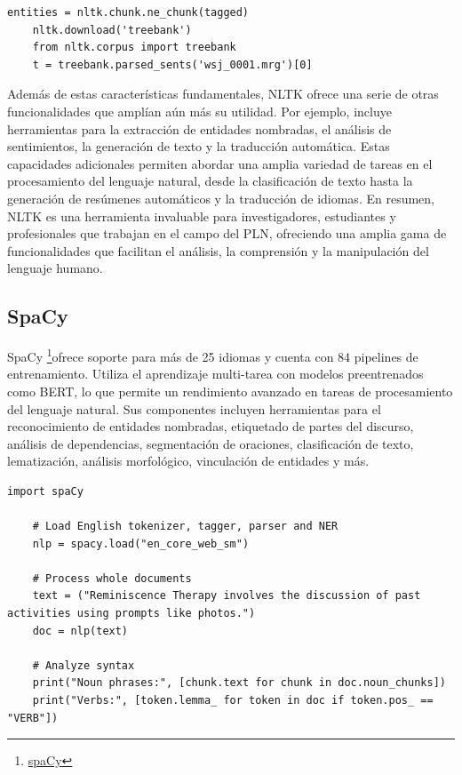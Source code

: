 \begin{lstlisting}[style=SpyderStyle, caption={Análisis sintáctico y lematización con nltk}, captionpos=b, label={lst:python},breaklines = true]
	entities = nltk.chunk.ne_chunk(tagged)
	nltk.download('treebank')
	from nltk.corpus import treebank
	t = treebank.parsed_sents('wsj_0001.mrg')[0]
\end{lstlisting}


Además de estas características fundamentales, NLTK ofrece una serie de otras funcionalidades que amplían aún más su utilidad. Por ejemplo, incluye herramientas para la extracción de entidades nombradas, el análisis de sentimientos, la generación de texto y la traducción automática. Estas capacidades adicionales permiten abordar una amplia variedad de tareas en el procesamiento del lenguaje natural, desde la clasificación de texto hasta la generación de resúmenes automáticos y la traducción de idiomas. En resumen, NLTK es una herramienta invaluable para investigadores, estudiantes y profesionales que trabajan en el campo del PLN, ofreciendo una amplia gama de funcionalidades que facilitan el análisis, la comprensión y la manipulación del lenguaje humano.


\subsection{SpaCy}
\label{sec:Spacy}
SpaCy \footnote{\href{https://spacy.io/}{spaCy}}ofrece soporte para más de 25 idiomas y cuenta con 84 pipelines de entrenamiento. Utiliza el aprendizaje multi-tarea con modelos preentrenados como BERT, lo que permite un rendimiento avanzado en tareas de procesamiento del lenguaje natural. Sus componentes incluyen herramientas para el reconocimiento de entidades nombradas, etiquetado de partes del discurso, análisis de dependencias, segmentación de oraciones, clasificación de texto, lematización, análisis morfológico, vinculación de entidades y más.

\begin{lstlisting}[style=SpyderStyle, caption={Ejemplo de tokenización usando spaCy}, captionpos=b, label={lst:python},breaklines = true]
	import spaCy
	
	# Load English tokenizer, tagger, parser and NER
	nlp = spacy.load("en_core_web_sm")
	
	# Process whole documents
	text = ("Reminiscence Therapy involves the discussion of past activities using prompts like photos.")
	doc = nlp(text)
	
	# Analyze syntax
	print("Noun phrases:", [chunk.text for chunk in doc.noun_chunks])
	print("Verbs:", [token.lemma_ for token in doc if token.pos_ == "VERB"])
\end{lstlisting}

